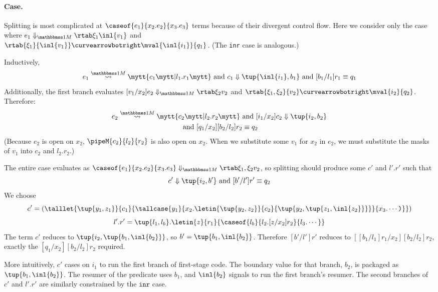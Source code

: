 \begin{abstrsyn}
\paragraph {Case.}
Splitting is most complicated at $\caseof {e_1} {x_2.e_2} {x_3.e_3}$ terms because of their divergent control flow.
Here we consider only the case where
$\diaone {e_1} {\xi_1} {\inl {v_1}}$ and \\ $\rtab {\xi_1} {\inl {v_1}} \vsplito \mval {\inl {i_1}} {q_1}$.
(The \texttt{inr} case is analogous.)

\noindent
Inductively,
\[
	\splitone {e_1} A {c_1} {l_1.r_1} \text{ and } \reduce {c_1} {\tup{\inl {i_1},b_1}} \text{ and } [b_1/l_1]r_1 \equiv q_1
\]
Additionally, the first branch evaluates $\diaone {[v_1/x_2]e_2} {\xi_2} {v_2}$
and $\rtab {\xi_1,\xi_2} {v_2} \vsplito \mval {i_2} {q_2}$.
Therefore:
\begin{gather*}
	\splitone {e_2} A {c_2} {l_2.r_2} \text{ and } \reduce {[i_1/x_2]c_2}
  {\tup{i_2,b_2}} \\
\text{ and } [q_1/x_2][b_2/l_2]r_2 \equiv q_2
\end{gather*}
(Because $e_2$ is open on $x_2$, $\pipeM{c_2}{l_2}{r_2}$ is also open on $x_2$.
When we substitute some $v_1$ for $x_2$ in $e_2$, we must substitute the masks
of $v_1$ into $c_2$ and $l_2.r_2$.)

The entire case evaluates as
$\diaone {\caseof {e_1} {x_2.e_2} {x_3.e_3}} {\xi_1,\xi_2} {v_2}$, so splitting should produce 
some $c'$ and
$l'.r'$ such that 
\[
  \reduce {c'} {\tup{i_2,b'}} \text{ and }
  [b'/l']r' \equiv q_2
\]
We choose
\[
c' =
{\left(
\talllet{\tup{y_1,z_1}}{c_1}{
\tallcase{y_1}
{x_2.\letin{\tup{y_2,z_2}}{c_2}{\tup{y_2,\tup{z_1,\inl{z_2}}}}}
{x_3.\cdots\ttrpar}
}\right)}
\]
\[
l'.r' =
\tup{l_1,l_b}.\letin{z}{r_1}{\caseof{l_b}{l_2.[z/x_2]{r_2}}{l_3.\cdots}}
\]
The term $c'$ reduces to
$\tup{i_2,\tup{b_1,\inl{b_2}}}$, so 
$b' = \tup{b_1,\inl{b_2}}$. Therefore
$[b'/l']r'$ reduces to
$[[b_1/l_1]r_1/x_2][b_2/l_2]r_2$, exactly the 
$[q_1/x_2][b_2/l_2]r_2$ required.

More intuitively, $c'$ cases on $i_1$ to run the first branch of first-stage
code. The boundary value for that branch, $b_2$, is packaged as $\tup {b_1, \inl
{b_2}}$. The resumer of the predicate uses $b_1$, and $\inl{b_2}$ signals to run
the first branch's resumer. The second branches of $c'$ and $l'.r'$ are
similarly constrained by the $\texttt{inr}$ case.



\end{abstrsyn}
